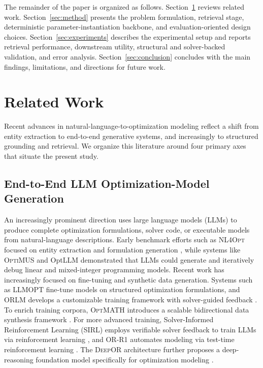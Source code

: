 \documentclass[3p]{elsarticle}
\begin{document}
The remainder of the paper is organized as follows. Section~\ref{sec:related_work} reviews related work. Section~\ref{sec:method} presents the problem formulation, retrieval stage, deterministic parameter-instantiation backbone, and evaluation-oriented design choices. Section~\ref{sec:experiments} describes the experimental setup and reports retrieval performance, downstream utility, structural and solver-backed validation, and error analysis. Section~\ref{sec:conclusion} concludes with the main findings, limitations, and directions for future work.

\section{Related Work}
\label{sec:related_work}

Recent advances in natural-language-to-optimization modeling reflect a shift from entity extraction to end-to-end generative systems, and increasingly to structured grounding and retrieval. We organize this literature around four primary axes that situate the present study.

\subsection{End-to-End LLM Optimization-Model Generation}
\label{subsec:rw_llm_generation}

An increasingly prominent direction uses large language models (LLMs) to produce complete optimization formulations, solver code, or executable models from natural-language descriptions. Early benchmark efforts such as \textsc{NL4Opt} focused on entity extraction and formulation generation \cite{ramamonjison2023nl4opt}, while systems like \textsc{OptiMUS} \cite{ahmaditeshnizi2024optimus_icml} and OptLLM \cite{zhang2024optllm} demonstrated that LLMs could generate and iteratively debug linear and mixed-integer programming models. Recent work has increasingly focused on fine-tuning and synthetic data generation. Systems such as \textsc{LLMOPT} \cite{jiang2025llmopt} fine-tune models on structured optimization formulations, and \textsc{ORLM} develops a customizable training framework with solver-guided feedback \cite{huang2025orlm}. To enrich training corpora, \textsc{OptMATH} introduces a scalable bidirectional data synthesis framework \cite{lu2025optmath}. For more advanced training, Solver-Informed Reinforcement Learning (SIRL) employs verifiable solver feedback to train LLMs via reinforcement learning \cite{chen2025solver}, and \textsc{OR-R1} automates modeling via test-time reinforcement learning \cite{ding2026orr1}. The \textsc{DeepOR} architecture further proposes a deep-reasoning foundation model specifically for optimization modeling \cite{xiao2026deepor}.
\end{document}

